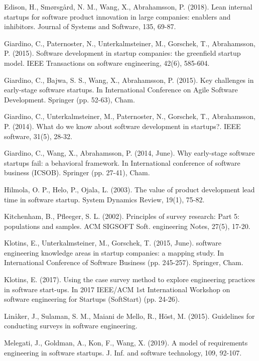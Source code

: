 \documentclass[runningheads]{llncs}
\begin{document}
\begin{thebibliography}{108}
Edison, H., Smørsgård, N. M., Wang, X., Abrahamsson, P. (2018). 
Lean internal startups for software product innovation in large companies: enablers and inhibitors. 
Journal of Systems and Software, 135, 69-87.

Giardino, C., Paternoster, N., Unterkalmsteiner, M., Gorschek, T., Abrahamsson, P. (2015). 
Software development in startup companies: the greenfield startup model. 
IEEE Transactions on software engineering, 42(6), 585-604.

Giardino, C., Bajwa, S. S., Wang, X., Abrahamsson, P. (2015). 
Key challenges in early-stage software startups. 
In International Conference on Agile Software Development. Springer (pp. 52-63), Cham.

Giardino, C., Unterkalmsteiner, M., Paternoster, N., Gorschek, T., Abrahamsson, P. (2014). 
What do we know about software development in startups?. 
IEEE software, 31(5), 28-32.

Giardino, C., Wang, X., Abrahamsson, P. (2014, June). 
Why early-stage software startups fail: a behavioral framework. In International conference of software business (ICSOB). 
Springer (pp. 27-41), Cham.

Hilmola, O. P., Helo, P., Ojala, L. (2003).
The value of product development lead time in software startup.
System Dynamics Review, 19(1), 75-82.

Kitchenham, B., Pfleeger, S. L. (2002). Principles of survey research: Part 5: populations and samples. ACM SIGSOFT Soft. engineering Notes, 27(5), 17-20.

Klotins, E., Unterkalmsteiner, M., Gorschek, T. (2015, June). 
software engineering knowledge areas in startup companies: a mapping study. 
In International Conference of Software Business (pp. 245-257). Springer, Cham.

Klotins, E. (2017). 
Using the case survey method to explore engineering practices in software start-ups. 
In 2017 IEEE/ACM 1st International Workshop on software engineering for Startups (SoftStart) (pp. 24-26).

Linåker, J., Sulaman, S. M., Maiani de Mello, R., Höst, M. (2015). 
Guidelines for conducting surveys in software engineering.

Melegati, J., Goldman, A., Kon, F., Wang, X. (2019). 
A model of requirements engineering in software startups. 
J. Inf. and software technology, 109, 92-107.


\end{thebibliography}
\end{document}
